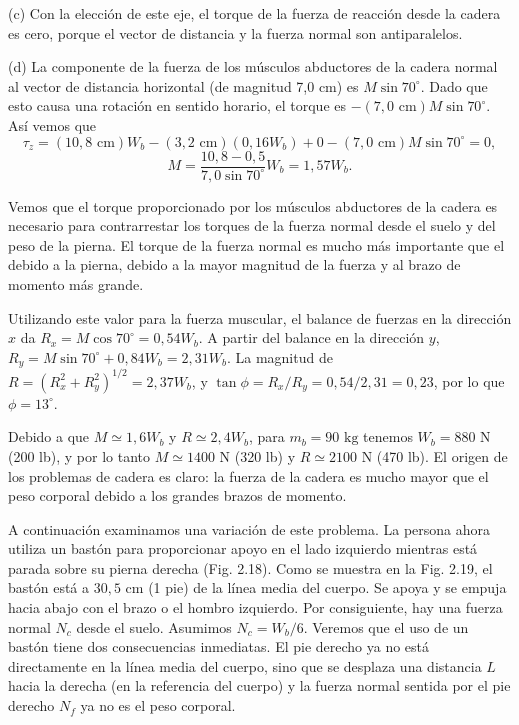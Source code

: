 \documentclass[12pt]{book}
\begin{document}
(c) Con la elección de este eje, el torque de la fuerza de reacción desde la cadera es cero, porque el vector de distancia y la fuerza normal son antiparalelos.

(d) La componente de la fuerza de los músculos abductores de la cadera normal al vector de distancia horizontal (de magnitud 7,0 cm) es $M \sin 70^\circ$. Dado que esto causa una rotación en sentido horario, el torque es $-(7,0\text{ cm})M \sin 70^\circ$. Así vemos que
\begin{equation}
\tau_z = (10,8\text{ cm})W_b - (3,2\text{ cm})(0,16 W_b) + 0 - (7,0\text{ cm})M \sin 70^\circ = 0,
\label{eq:2.27}
\end{equation}
\begin{equation}
M = \frac{10,8 - 0,5}{7,0 \sin 70^\circ} W_b = 1,57 W_b.
\label{eq:2.28}
\end{equation}

Vemos que el torque proporcionado por los músculos abductores de la cadera es necesario para contrarrestar los torques de la fuerza normal desde el suelo y del peso de la pierna. El torque de la fuerza normal es mucho más importante que el debido a la pierna, debido a la mayor magnitud de la fuerza y al brazo de momento más grande.

Utilizando este valor para la fuerza muscular, el balance de fuerzas en la dirección $x$ da $R_x = M \cos 70^\circ = 0,54 W_b$. A partir del balance en la dirección $y$, $R_y = M \sin 70^\circ + 0,84 W_b = 2,31 W_b$. La magnitud de $R = (R_x^2 + R_y^2)^{1/2} = 2,37 W_b$, y $\tan \phi = R_x/R_y = 0,54/2,31 = 0,23$, por lo que $\phi = 13^\circ$.

Debido a que $M \simeq 1,6 W_b$ y $R \simeq 2,4 W_b$, para $m_b = 90\text{ kg}$ tenemos $W_b = 880\text{ N}$ (200 lb), y por lo tanto $M \simeq 1400\text{ N}$ (320 lb) y $R \simeq 2100\text{ N}$ (470 lb). El origen de los problemas de cadera es claro: la fuerza de la cadera es mucho mayor que el peso corporal debido a los grandes brazos de momento.

A continuación examinamos una variación de este problema. La persona ahora utiliza un bastón para proporcionar apoyo en el lado izquierdo mientras está parada sobre su pierna derecha (Fig. 2.18). Como se muestra en la Fig. 2.19, el bastón está a $30,5\text{ cm}$ (1 pie) de la línea media del cuerpo. Se apoya y se empuja hacia abajo con el brazo o el hombro izquierdo. Por consiguiente, hay una fuerza normal $N_c$ desde el suelo. Asumimos $N_c = W_b/6$. Veremos que el uso de un bastón tiene dos consecuencias inmediatas. El pie derecho ya no está directamente en la línea media del cuerpo, sino que se desplaza una distancia $L$ hacia la derecha (en la referencia del cuerpo) y la fuerza normal sentida por el pie derecho $N_f$ ya no es el peso corporal.
\end{document}
